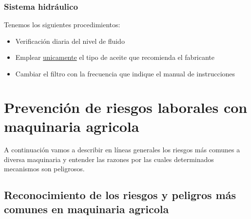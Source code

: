 \documentclass[a4paper,12pt,oneside]{book}
\begin{document}
\subsection{Sistema hidráulico}
\label{sec:orgf8da05c}

Tenemos los siguientes procedimientos:
\begin{itemize}
\item Verificación diaria del nivel de fluido
\item Emplear \uline{unicamente} el tipo de aceite que recomienda el fabricante
\item Cambiar el filtro con la frecuencia que indique el manual de instrucciones
\end{itemize}

\chapter{Prevención de riesgos laborales con maquinaria agricola}
\label{sec:org090eff8}

A continuación vamos a describir en líneas generales los riesgos más comunes a
diversa maquinaria y entender las razones por las cuales determinados mecanismos
son peligrosos. 

\vspace{1cm}
\noindent
{} 

\section{Reconocimiento de los riesgos y peligros más comunes en maquinaria agricola}
\label{sec:org15b7a08}
\end{document}
